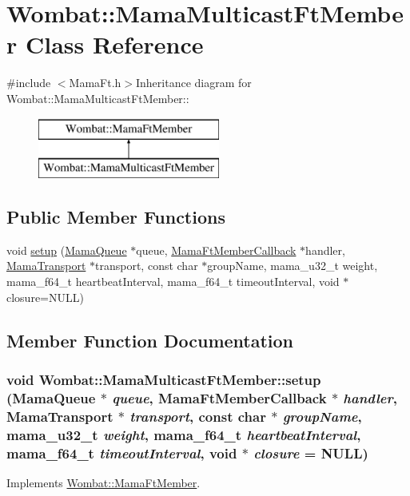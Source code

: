 \hypertarget{classWombat_1_1MamaMulticastFtMember}{
\section{Wombat::MamaMulticastFtMember Class Reference}
\label{classWombat_1_1MamaMulticastFtMember}
}


{\ttfamily \#include $<$MamaFt.h$>$}Inheritance diagram for Wombat::MamaMulticastFtMember::\begin{figure}[H]
\begin{center}
\leavevmode
\includegraphics[height=2cm]{classWombat_1_1MamaMulticastFtMember}
\end{center}
\end{figure}
\subsection*{Public Member Functions}
\begin{DoxyCompactItemize}
\item 
void \hyperlink{classWombat_1_1MamaMulticastFtMember_abff24b52a220beafca46481139f66e67}{setup} (\hyperlink{classWombat_1_1MamaQueue}{MamaQueue} $\ast$queue, \hyperlink{classWombat_1_1MamaFtMemberCallback}{MamaFtMemberCallback} $\ast$handler, \hyperlink{classWombat_1_1MamaTransport}{MamaTransport} $\ast$transport, const char $\ast$groupName, mama\_\-u32\_\-t weight, mama\_\-f64\_\-t heartbeatInterval, mama\_\-f64\_\-t timeoutInterval, void $\ast$closure=NULL)
\end{DoxyCompactItemize}


\subsection{Member Function Documentation}
\hypertarget{classWombat_1_1MamaMulticastFtMember_abff24b52a220beafca46481139f66e67}{
\subsubsection[{setup}]{\setlength{\rightskip}{0pt plus 5cm}void Wombat::MamaMulticastFtMember::setup ({\bf MamaQueue} $\ast$ {\em queue}, \/  {\bf MamaFtMemberCallback} $\ast$ {\em handler}, \/  {\bf MamaTransport} $\ast$ {\em transport}, \/  const char $\ast$ {\em groupName}, \/  mama\_\-u32\_\-t {\em weight}, \/  mama\_\-f64\_\-t {\em heartbeatInterval}, \/  mama\_\-f64\_\-t {\em timeoutInterval}, \/  void $\ast$ {\em closure} = {\ttfamily NULL})}}
\label{classWombat_1_1MamaMulticastFtMember_abff24b52a220beafca46481139f66e67}


Implements \hyperlink{classWombat_1_1MamaFtMember_a5a57ce6bb1f5d7ff85eac37acbf4b405}{Wombat::MamaFtMember}.